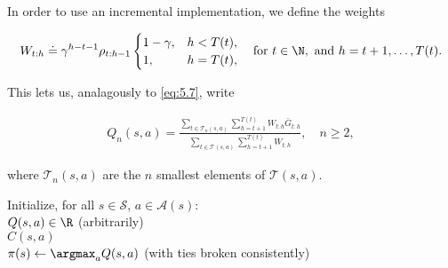 \begin{solution}
In order to use an incremental implementation, we define the weights

\begin{align*}
    W_{t:h}
    \doteq
    \gamma^{h-t-1}
    \rho_{t:h-1}
    \begin{cases}
        1 - \gamma, & h < T(t), \\
        1,          & h = T(t),
    \end{cases}
    \quad
    \text{for}~
    t \in \N,
    ~\text{and}~
    h = t + 1, \dots, T(t).
\end{align*}

This lets us, analagously to \eqref{eq:5.7}, write

\begin{align} \label{eq:5.7'} \tag{5.7$^\prime$}
    Q_n(s, a)
    =
    \frac
    {
        \sum_{t \in \mathcal T_n(s, a)}
            \sum_{h=t+1}^{T(t)}
                W_{t:h} \bar G_{t:h}
    }{
        \sum_{t \in \mathcal T(s, a)}
            \sum_{h=t+1}^{T(t)}
                W_{t:h}
    },
    \quad
    n \geq 2,
\end{align}

where $\mathcal T_n(s, a)$ are the $n$ smallest elements of $\mathcal T(s, a)$.

\begin{tcolorbox}[title = {Off-policy MC control, for estimating $\pi \approx \pi_\ast$, using \eqref{eq:5.10'}}]

    Initialize, for all $s \in \mathcal S$, $a \in \mathcal A(s)$: \\
    \hspace*{0.5cm} $Q(s, a) \in \R$ (arbitrarily) \\
    \hspace*{0.5cm} $C(s, a)$ \\
    \hspace*{0.5cm} $\pi(s) \leftarrow \argmax_a Q(s, a)$ \hspace*{0.5cm} (with ties broken consistently) \\


\end{tcolorbox}
\end{solution}
